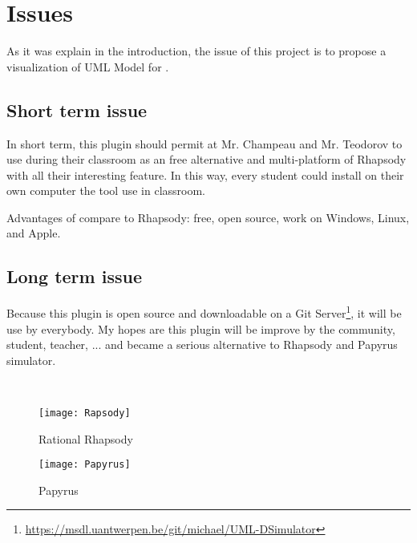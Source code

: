 
\chapter{Issues}
\label{chap:issues}


As it was explain in the introduction, the issue of this project is to propose a visualization of UML Model for \umld.

\section{Short term issue}

In short term, this plugin should permit at Mr. Champeau and Mr. Teodorov to use during their classroom \umld as an free alternative and multi-platform of Rhapsody with all their interesting feature. In this way, every student could install on their own computer the tool use in classroom.

Advantages of \umld compare to Rhapsody: free, open source, work on Windows, Linux, and Apple.

\section{Long term issue}

Because this plugin is open source and downloadable on a Git Server\footnote{\url{https://msdl.uantwerpen.be/git/michael/UML-DSimulator}}, it will be use by everybody. My hopes are this plugin will be improve by the community, student, teacher, \etc... and became a serious alternative to Rhapsody and Papyrus simulator.

~\\

  \begin{figure}[h]
    \begin{minipage}{0.45\linewidth}
      \centering
      \texttt{[image: Rapsody]}
      \caption{Rational Rhapsody}
      \label{fig:rhapsody}
    \end{minipage}\hfill
    \begin{minipage}{0.45\linewidth}
      \centering
      \texttt{[image: Papyrus]}
      \caption{Papyrus}
      \label{fig:papyrus}
    \end{minipage}
  \end{figure}


